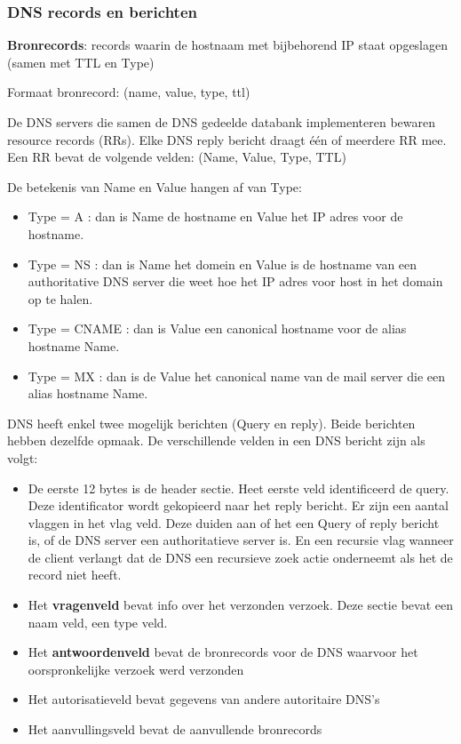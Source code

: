 \newpage

\subsubsection{DNS records en berichten}

\noindent \textbf{Bronrecords}: records waarin de hostnaam met bijbehorend IP staat opgeslagen (samen met TTL en Type)

\noindent Formaat bronrecord: (name, value, type, ttl)

\noindent De DNS servers die samen de DNS gedeelde databank implementeren bewaren resource records (RRs). Elke DNS reply bericht draagt één of meerdere RR mee. Een RR bevat de volgende velden:
(Name, Value, Type, TTL)

\noindent De betekenis van Name en Value hangen af van Type:
\begin{itemize}
   \item Type = A : dan is Name de hostname en Value het IP adres voor de hostname.
 \item Type = NS : dan is Name het domein en Value is de hostname van een authoritative DNS server die weet hoe het IP adres voor host in het domain op te halen.
 \item Type = CNAME : dan is Value een canonical hostname voor de alias hostname Name.
 \item Type = MX : dan is de Value het canonical name van de mail server die een alias hostname Name.
\end{itemize}



DNS heeft enkel twee mogelijk berichten (Query en reply). Beide berichten hebben dezelfde opmaak. De verschillende velden in een DNS bericht zijn als volgt:
\begin{itemize}
   \item De eerste 12 bytes is de header sectie. Heet eerste veld identificeerd de query. Deze identificator wordt gekopieerd naar het reply bericht. Er zijn een aantal vlaggen in het vlag veld. Deze duiden aan of het een Query of reply bericht is, of de DNS server een authoritatieve server is. En een recursie vlag wanneer de client verlangt dat de DNS een recursieve zoek actie onderneemt als het de record niet heeft.
\item Het \textbf{vragenveld} bevat info over het verzonden verzoek. Deze sectie bevat een naam veld, een type veld.
\item Het \textbf{antwoordenveld} bevat de bronrecords voor de DNS waarvoor het oorspronkelijke verzoek werd verzonden
\item Het autorisatieveld bevat gegevens van andere autoritaire DNS’s
\item Het aanvullingsveld bevat de aanvullende bronrecords
\end{itemize}


